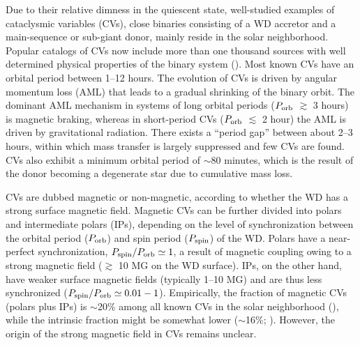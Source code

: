 \documentclass[fleqn,usenatbib]{mnras}
\begin{document}
Due to their relative dimness in the quiescent state,
well-studied examples of cataclysmic variables (CVs), close binaries consisting of a WD accretor and a main-sequence or sub-giant donor, mainly reside in the solar neighborhood. 
Popular catalogs of CVs now include more than one thousand sources with well determined physical properties of the binary system (\citealp{2001PASP..113..764D,2003A&A...404..301R}).
Most known CVs have an orbital period between 1--12 hours.
The evolution of CVs is driven by angular momentum loss (AML) that leads to a gradual shrinking of the binary orbit.
The dominant AML mechanism in systems of long orbital periods ($P_{\rm orb}$ $\gtrsim$ 3 hours) is magnetic braking, whereas in short-period CVs ($P_{\rm orb}$ $\lesssim$ 2 hour) the AML is driven by gravitational radiation. There exists a ``period gap'' between about 2--3 hours, within which mass transfer is largely suppressed and few CVs are found. CVs also exhibit a minimum orbital period of $\sim$80 minutes, which is the result of the donor becoming a degenerate star due to cumulative mass loss. 
 
CVs are dubbed magnetic or non-magnetic, according to whether the WD has a strong surface magnetic field. Magnetic CVs can be further divided into polars and intermediate polars (IPs), depending on the level of synchronization between the orbital period ($P_{\rm orb}$) and spin period ($P_{\rm spin}$) of the WD. Polars have a near-perfect synchronization, $P_{\rm spin}/P_{\rm orb}\simeq 1$, a result of magnetic coupling owing to a strong magnetic field ($\gtrsim$ 10 MG on the WD surface).
IPs, on the other hand, have weaker surface magnetic fields (typically 1--10 MG) and are thus less synchronized ($P_{\rm spin}/P_{\rm orb}\simeq 0.01-1$).
Empirically, the fraction of magnetic CVs (polars plus IPs) is $\sim$20\% among all known CVs in the solar neighborhood (\citealt{2003A&A...404..301R}), while the intrinsic fraction might be somewhat lower ($\sim$16\%; \citealp{2013MNRAS.432..570P}).
However, the origin of the strong magnetic field in CVs remains unclear. 
\end{document}
